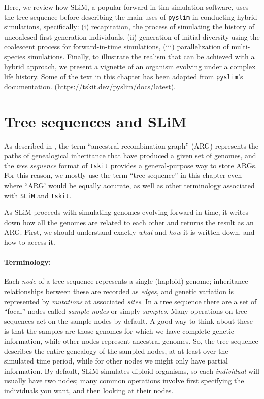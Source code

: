 \documentclass[12pt]{article}
\newcommand{\tskit}[0]{\texttt{tskit}\xspace}
\newcommand{\slim}[0]{\texttt{SLiM}\xspace}
\newcommand{\pyslim}[0]{\texttt{pyslim}\xspace}
\begin{document}
Here, we review how SLiM, a popular forward-in-tim simulation software, uses the tree sequence before describing
the main uses of \pyslim in conducting hybrid simulations, specifically:
(i) recapitation, the process of simulating the history of uncoalesed first-generation individuals,
(ii) generation of initial diversity using the coalescent process for forward-in-time simulations,
(iii) parallelization of multi-species simulations.
Finally, to illustrate the realism that can be achieved with a hybrid approach, we present a vignette of an organism evolving under a complex life history.
Some of the text in this chapter has been adapted from \pyslim's documentation.
(\url{https://tskit.dev/pyslim/docs/latest}).

\section{Tree sequences and SLiM}
As described in \citet{wong}, the term ``ancestral recombination graph'' (ARG)
represents the paths of genealogical inheritance that have produced a given set of genomes,
and the \emph{tree sequence} format of \tskit provides a general-purpose way to store ARGs.
For this reason, we mostly use the term ``tree sequence'' in this chapter even where ``ARG'
would be equally accurate, as well as other terminology associated with \slim and \tskit \citet{XXX}.

As SLiM proceeds with simulating genomes evolving forward-in-time, it writes down
how all the genomes are related to each other and returns the result as an ARG.
First, we should understand exactly \emph{what} and \emph{how} it is written down, and how to access it.

\paragraph{Terminology:}
Each \textit{node} of a tree sequence represents a single (haploid) genome;
inheritance relationships between these are recorded as \textit{edges},
and genetic variation is represented by \textit{mutations} at associated \textit{sites}.
In a tree sequence there are a set of ``focal'' nodes called \textit{sample nodes} or simply \textit{samples}.
Many operations on tree sequences act on the sample nodes by default.
A good way to think about these is that the samples are those genomes
for which we have complete genetic information, while other nodes represent ancestral genomes.
So, the tree sequence describes the entire genealogy of the sampled nodes,
at at least over the simulated time period,
while for other nodes we might only have partial information.
By default, SLiM simulates diploid organisms, so each \textit{individual} will usually have two nodes;
many common operations involve first specifying the individuals you want,
and then looking at their nodes.
\end{document}

